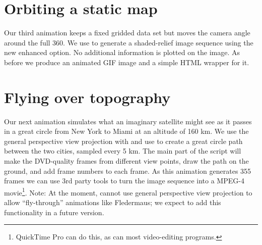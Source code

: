
\section{Orbiting a static map}

Our third animation keeps a fixed gridded data set but moves the camera
angle around the full 360\DS.  We use  to generate a
shaded-relief image sequence using the new enhanced  option.
No additional information is plotted on the image.  As before we produce
an animated GIF image and a simple HTML wrapper for it.




\section{Flying over topography}

Our next animation simulates what an imaginary satellite might see as it passes
in a great circle from New York to Miami at an altitude of 160 km.
We use the general perspective view projection with  and
use  to create a great circle path between the two cities,
sampled every 5 km.  The main part of the script will make the DVD-quality frames from
different view points, draw the path on the ground, and add frame numbers to
each frame.  As this animation generates 355 frames we can use 3rd party tools
to turn the image sequence into a MPEG-4 movie\footnote{QuickTime Pro can do this,
as can most video-editing programs.}. Note: At the moment,  cannot
use general perspective view projection to allow ``fly-through'' animations like
Fledermaus; we expect to add this functionality in a future version.


